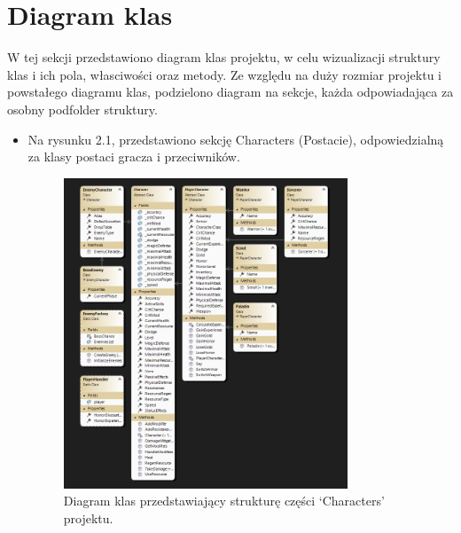 \section{Diagram klas}
W tej sekcji przedstawiono diagram klas projektu, w celu wizualizacji struktury klas i ich pola, własciwości oraz metody.
Ze względu na duży rozmiar projektu i powstałego diagramu klas, podzielono diagram na sekcje, każda odpowiadająca za osobny podfolder struktury.
\begin{itemize}
    \item Na rysunku 2.1, przedstawiono sekcję Characters (Postacie), odpowiedzialną za klasy postaci gracza i przeciwników.
        \begin{figure}[H]
        \centering
        \includegraphics[width=0.8\textwidth]{figures/class_diagram_characters.png}
        \caption{Diagram klas przedstawiający strukturę części `Characters' projektu.}
        \label{fig:class_diagram_characters}
        \end{figure}


\end{itemize}
